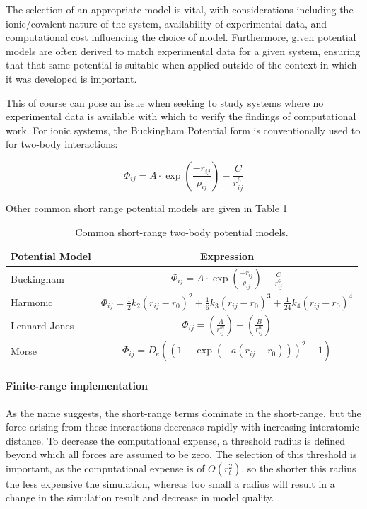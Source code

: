 The selection of an appropriate model is vital, with considerations including the ionic/covalent nature of the system, availability of experimental data, and computational cost influencing the choice of model.
Furthermore, given potential models are often derived to match experimental data for a given system, ensuring that that same potential is suitable when applied outside of the context in which it was developed is important.

This of course can pose an issue when seeking to study systems where no experimental data is available with which to verify the findings of computational work.
 For ionic systems, the Buckingham Potential form is conventionally used to for two-body interactions:


\begin{equation}
\Phi_{ij} = A\cdot \exp \left(\frac{-r_{ij}}{\rho_{ij}} \right) - \frac{C}{r_{ij}^6}
\label{eq:Buckingham}
\end{equation}

\noindent Other common short range potential models are given in Table \ref{tab:potentialmodels}

\begin{table}[t]
  \centering
  \caption{Common short-range two-body potential models.\cite{Gale2003}}
  \label{tab:potentialmodels}
  \begin{tabular}{@{}lc@{}}
  \toprule
  Potential Model         & Expression     \\
  \midrule
  Buckingham              & $\displaystyle{\Phi_{ij} = A\cdot \exp \left(\frac{-r_{ij}}{\rho_{ij}} \right) - \frac{C}{r_{ij}^6}}$    \\
  \addlinespace
  Harmonic                & $\displaystyle{\Phi_{ij} = \frac{1}{2}k_2(r_{ij}-r_0)^2   + \frac{1}{6}k_3(r_{ij}-r_0)^3    + \frac{1}{24}k_4(r_{ij}-r_0)^4   }$    \\
  \addlinespace
  Lennard-Jones           & $\displaystyle{\Phi_{ij} = \left(\frac{A}{r_{ij}^m} \right) - \left( \frac{B}{r_{ij}^n}\right)}$   \\
  \addlinespace
  Morse                   & $\displaystyle{\Phi_{ij} = D_e \left((1- \exp(-a(r_{ij} - r_0)))^2           -1\right) }$    \\
  \bottomrule
  \end{tabular}
\end{table}

\vspace{-5pt}
\paragraph{Finite-range implementation}
As the name suggests, the short-range terms dominate in the short-range, but the force arising from these interactions decreases rapidly with increasing interatomic distance.
To decrease the computational expense, a threshold radius is defined beyond which all forces are assumed to be zero.
The selection of this threshold is important, as the computational expense is of $O(r_t^2)$, so the shorter this radius the less expensive the simulation, whereas too small a radius will result in a change in the simulation result and decrease in model quality.

